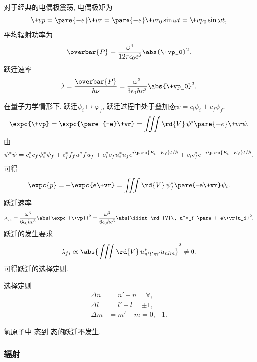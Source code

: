 \documentclass[hidelinks]{ctexart}
\begin{document}
对于经典的电偶极震荡, 电偶极矩为
\[ \+vp = \pare{-e}\+vr = \pare{-e}\+vr_0 \sin \omega t = \+vp_0 \sin \omega t, \]
平均辐射功率为
\[ \overbar{P} = \frac{\omega^4}{12\pi\epsilon_0 c^3}\abs{\+vp_0}^2. \]
跃迁速率
\[ \lambda = \frac{\overbar{P}}{h\nu} = \frac{\omega^3}{6\epsilon_0 hc^2}\abs{\+vp_0}^2. \]
\par
在量子力学情形下, 跃迁$\displaystyle \psi_i \mapsto \varphi_f$, 跃迁过程中处于叠加态$\psi = c_i \psi_i + c_f \psi_f$.
\[ \expc{\+vp} = \expc{\pare{-e}\+vr} = \iiint \rd{V}\, \psi^* \pare{-e} \+vr\psi. \]
由
\[ \psi^* \psi = c^*_i c_f \psi^*_i \psi_f + c^*_f f_f u^*f u_f + c^*_i c_f u^*_i u_f e^{i\pare{E_i - E_f}t/\hbar} + c_i c^*_f e^{-i\pare{E_i - E_f}t/\hbar}. \]
可得
\[ \expc{p} = -\expc{e\+vr} = \iiint\rd{V}\, \psi^*_f \pare{-e\+vr}\psi_i. \]
跃迁速率
\[ \lambda_{fi} = \frac{\omega^3}{6\epsilon_0 hc^3}\abs{\expc{\+vp}}^2 = \frac{\omega^3}{6\epsilon_0 hc^3} \abs{\iiint \rd{V}\, u^*_f \pare{-e\+vr}u_i}^2. \]
跃迁的发生要求
\[ \lambda_{fi} \propto \abs{\iiint \rd{V}\, u^*_{n'l'm'}u_{nlm}}^2 \neq 0. \]
可得跃迁的选择定则.
\begin{resume}
    选择定则
    \begin{align*}
        \Delta n &= n' - n = \forall,\\
        \Delta l &= l' - l = \pm 1, \\
        \Delta m &= m' - m = 0,\pm 1.
    \end{align*}
\end{resume}
\begin{ex}
    氢原子中  态到  态的跃迁不发生.
\end{ex}


\subsubsection{辐射} %
\label{ssub:辐射}
\end{document}
